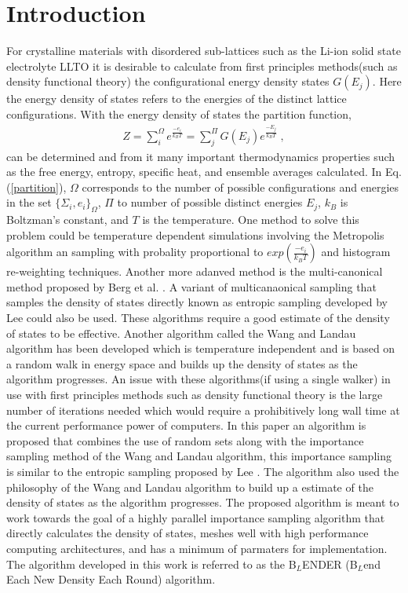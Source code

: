 \documentclass[ aip,jmp,bmf,sd,rsi, amsmath,amssymb,preprint, reprint,author-year,author-numerical, Conference Proceedings]{revtex4-1}
\begin{document}
\section{Introduction}
For crystalline  materials  with disordered sub-lattices such as the Li-ion solid state electrolyte LLTO it is desirable to calculate from first principles methods(such as density functional theory\cite{kohn:1965}) the configurational  energy density states $G(E_j)$. Here the energy density of states refers to the energies of the distinct lattice configurations. With the energy density of states the partition function,
\begin{equation}
\begin{split}
Z = \sum_{i}^{\Omega}e^{\frac{-e_i}{k_B T} }= \sum_{j}^{\Pi}G(E_j)e^{\frac{-E_j}{k_BT}} \;,
\end{split}
\label{partition}
\end{equation}
can be  determined and from it many important thermodynamics properties such as the free energy, entropy, specific heat, and ensemble averages calculated. In Eq. (\ref{partition}), $\Omega$ corresponds to the number of possible configurations and energies in the set $\{\Sigma_i,e_i\}_\Omega$, $\Pi$ to number of possible distinct energies $E_j$, $k_B$ is Boltzman's constant, and $T$ is 
the temperature. One method to solve this problem could be temperature dependent simulations involving the  Metropolis algorithm an sampling with probality proportional  to $exp(\frac{-e_i}{k_B T})$ 
and histogram re-weighting techniques\cite{metropolis_equation_1953, landau_MC_simulations}. Another more adanved method is the multi-canonical method proposed by Berg et al. \cite{Multi_Canonical}. A variant of multicanaonical sampling that samples the density of states directly known as entropic sampling developed by Lee \cite{Entropic_Sampling} could also be used. 
These algorithms require a good estimate of the density of states to be effective.  Another algorithm called the  Wang and Landau algorithm \cite{WL_phys_rev_lett} has been developed which is temperature independent and is based on a random walk in energy space and builds up the density of states as the algorithm progresses.  An issue with these algorithms(if using a single walker) in use with first principles methods such as density functional theory is the large number of iterations needed which would require a prohibitively long wall time at the current performance power of computers.  In this paper an algorithm is proposed that combines the use of random sets along with the importance sampling method of the Wang and Landau algorithm, this importance sampling is similar to the entropic sampling proposed by Lee \cite{Entropic_Sampling}. The algorithm also used the philosophy of the Wang and Landau algorithm to build up a estimate of the density of states as the algorithm progresses.  The proposed algorithm is meant to work towards the goal of a highly parallel importance sampling algorithm that directly calculates the density of states, meshes well with high performance computing architectures, and has a minimum of parmaters for implementation. The algorithm developed in this work is referred to as the B$_{L}$ENDER (B$_{L}$end Each New Density Each Round) algorithm. 



\end{document}

